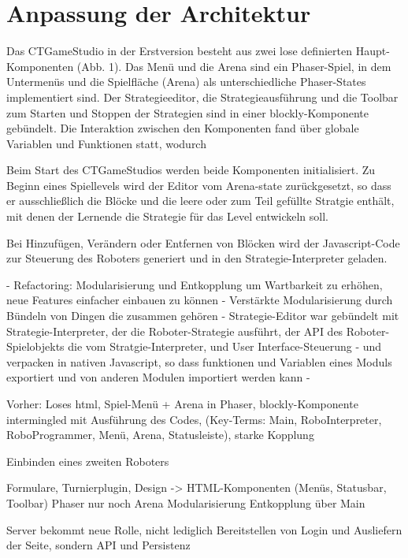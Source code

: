 

\section{Anpassung der Architektur}

Das CTGameStudio in der Erstversion besteht aus zwei lose definierten Haupt-Komponenten (Abb. 1).
Das Menü und die Arena sind ein Phaser-Spiel, in dem Untermenüs und die Spielfläche (Arena) als
unterschiedliche Phaser-States implementiert sind. Der Strategieeditor, die Strategieausführung und
die Toolbar zum Starten und Stoppen der Strategien sind in einer blockly-Komponente gebündelt. Die
Interaktion zwischen den Komponenten fand über globale Variablen und Funktionen statt, wodurch

Beim Start des CTGameStudios werden beide Komponenten initialisiert. Zu Beginn eines Spiellevels
wird der Editor vom Arena-state zurückgesetzt, so dass er ausschließlich die Blöcke und die leere
oder zum Teil gefüllte Stratgie enthält, mit denen der Lernende die Strategie für das Level
entwickeln soll.

Bei Hinzufügen, Verändern oder Entfernen von Blöcken wird der Javascript-Code zur Steuerung des
Roboters generiert und in den Strategie-Interpreter geladen.


- Refactoring: Modularisierung und Entkopplung um Wartbarkeit zu erhöhen, neue Features einfacher
einbauen zu können - Verstärkte Modularisierung durch Bündeln von Dingen die zusammen gehören -
Strategie-Editor war gebündelt mit Strategie-Interpreter, der die Roboter-Strategie ausführt, der
API des Roboter-Spielobjekts die vom Stratgie-Interpreter, und User Interface-Steuerung - und
verpacken in nativen Javascript, so dass funktionen und Variablen eines Moduls exportiert und von
anderen Modulen importiert werden kann - 


Vorher: Loses html, Spiel-Menü + Arena in Phaser, blockly-Komponente intermingled mit Ausführung des
Codes, (Key-Terms: Main, RoboInterpreter, RoboProgrammer, Menü, Arena, Statusleiste), starke
Kopplung

Einbinden eines zweiten Roboters

Formulare, Turnierplugin, Design -> HTML-Komponenten (Menüs, Statusbar, Toolbar) Phaser nur noch
Arena Modularisierung Entkopplung über Main

Server bekommt neue Rolle, nicht lediglich Bereitstellen von Login und Ausliefern der Seite, sondern
API und Persistenz

